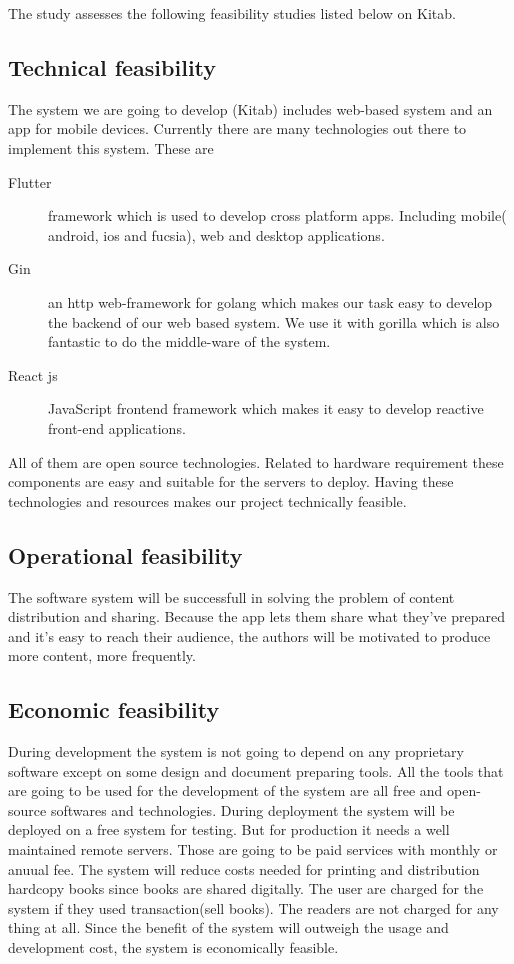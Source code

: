 \bigskip

The study assesses the following feasibility studies listed below on Kitab.

	\subsection{Technical feasibility}
The system we are going to develop (Kitab) includes web-based system and an app for mobile devices. Currently there are many technologies out there to implement this system.
These are

	\begin{description}
	\item[Flutter] framework which is used to develop cross platform apps. Including mobile( android, ios and fucsia), web and desktop applications.
	\item[Gin] an http web-framework for golang which makes our task easy to develop the backend of our web based system. We use it with gorilla which is also fantastic to do the middle-ware of the system.
	\item[React js] JavaScript frontend framework which makes it easy to develop reactive front-end applications.
	\end{description}

All of them are open source technologies. Related to hardware requirement these components are easy and suitable for the servers to deploy. Having these technologies and resources makes our project technically feasible.

	\subsection{Operational feasibility}
The software system will be successfull in solving the problem of content distribution and sharing. Because the app lets them share what they've prepared and it's easy to reach their audience, the authors will be motivated to produce more content, more frequently. 

	\subsection{Economic feasibility}
   During development the system is not going to depend on any proprietary software except on some design and document preparing tools. All the tools that are going to be used for the development of the system are all free and open-source softwares and technologies.
   During deployment the system will be deployed on a free system for testing. But for production it needs a well maintained remote servers. Those are going to be paid services with monthly or anuual fee. The system will reduce costs needed for printing and distribution hardcopy books since books are shared digitally. The user are charged for the system if they used transaction(sell books). The readers are not charged for any thing at all. Since the benefit of the system will outweigh the usage and development cost, the system is economically feasible.

